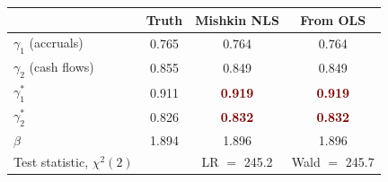 \begin{tabular}{@{}lccc@{}}
\toprule
 & Truth & Mishkin NLS & From OLS \\
\midrule
$\gamma_1$ (accruals) & 0.765 & 0.764 & 0.764 \\
$\gamma_2$ (cash flows) & 0.855 & 0.849 & 0.849 \\
$\gamma_1^{*}$ & 0.911 & \textcolor{Maroon}{\bfseries 0.919} & \textcolor{Maroon}{\bfseries 0.919} \\
$\gamma_2^{*}$ & 0.826 & \textcolor{Maroon}{\bfseries 0.832} & \textcolor{Maroon}{\bfseries 0.832} \\
$\beta$ & 1.894 & 1.896 & 1.896 \\
\midrule
Test statistic, $\chi^2(2)$ & & LR $=$ 245.2 & Wald $=$ 245.7 \\
\bottomrule
\end{tabular}
